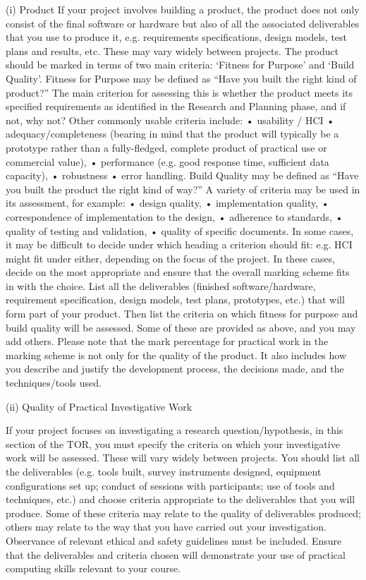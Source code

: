 \documentclass[../CHEFCookingHelperForEveryonesFridge.tex]{subfiles}
\begin{document}
{    (i)	Product
    If your project involves building a product, the product does not only consist of the final software or hardware but also of all the
    associated deliverables that you use to produce it, e.g. requirements specifications, design models, test plans and results, etc. These may vary widely between projects.
    The product should be marked in terms of two main criteria: ‘Fitness for Purpose’ and ‘Build Quality’.
    	Fitness for Purpose may be defined as “Have you built the right kind of product?”
    The main criterion for assessing this is whether the product meets its specified requirements as identified in the Research and Planning phase,
    and if not, why not? Other commonly usable criteria include:
    •	usability / HCI
    •	adequacy/completeness (bearing in mind that the product will typically be a prototype rather than a fully-fledged, complete product of practical use or commercial value),
    •	performance (e.g. good response time, sufficient data capacity),
    •	robustness
    •	error handling.
    Build Quality may be defined as “Have you built the product the right kind of way?”
    	A variety of criteria may be used in its assessment, for example:
    •	design quality,
    •	implementation quality,
    •	correspondence of implementation to the design,
    •	adherence to standards,
    •	quality of testing and validation,
    •	quality of specific documents.
    In some cases, it may be difficult to decide under which heading a criterion should fit: e.g. HCI might fit under either,
    depending on the focus of the project.  In these cases, decide on the most appropriate and ensure that the overall marking scheme fits in with the choice.
    List all the deliverables (finished software/hardware, requirement specification, design models, test plans, prototypes, etc.)
    that will form part of your product. Then list the criteria on which fitness for purpose and build quality will be assessed.
    Some of these are provided as above, and you may add others.
    Please note that the mark percentage for practical work in the marking scheme is not only for the quality of the product.
    It also includes how you describe and justify the development process, the decisions made, and the techniques/tools used.


    (ii)	Quality of Practical Investigative Work

    If your project focuses on investigating a research question/hypothesis, in this section of the TOR, you must specify the criteria
    on which your investigative work will be assessed. These will vary widely between projects. You should list all the deliverables
    (e.g. tools built, survey instruments designed, equipment configurations set up; conduct of sessions with participants; use of tools and techniques, etc.)
    and choose criteria appropriate to the deliverables that you will produce. Some of these criteria may relate to the quality of deliverables produced;
    others may relate to the way that you have carried out your investigation. Observance of relevant ethical and safety guidelines must be included.
    Ensure that the deliverables and criteria chosen will demonstrate your use of practical computing skills relevant to your course.

}
\end{document}
